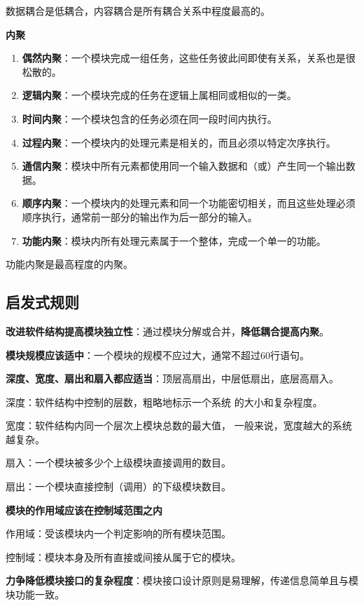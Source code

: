 \documentclass[cn, blue, normal, 12pt]{elegantnote}
\begin{document}
数据耦合是低耦合，内容耦合是所有耦合关系中程度最高的。

\textbf{内聚}

\begin{enumerate}
    \item \textbf{偶然内聚}：一个模块完成一组任务，这些任务彼此间即使有关系，关系也是很松散的。
    \item \textbf{逻辑内聚}：一个模块完成的任务在逻辑上属相同或相似的一类。
    \item \textbf{时间内聚}：一个模块包含的任务必须在同一段时间内执行。
    \item \textbf{过程内聚}：一个模块内的处理元素是相关的，而且必须以特定次序执行。
    \item \textbf{通信内聚}：模块中所有元素都使用同一个输入数据和（或）产生同一个输出数据。
    \item \textbf{顺序内聚}：一个模块内的处理元素和同一个功能密切相关，而且这些处理必须顺序执行，通常前一部分的输出作为后一部分的输入。
    \item \textbf{功能内聚}：模块内所有处理元素属于一个整体，完成一个单一的功能。
\end{enumerate}

功能内聚是最高程度的内聚。

\subsection{启发式规则}

\textbf{改进软件结构提高模块独立性}：通过模块分解或合并，\textbf{降低耦合提高内聚}。

\textbf{模块规模应该适中}：一个模块的规模不应过大，通常不超过60行语句。

\textbf{深度、宽度、扇出和扇入都应适当}：顶层高扇出，中层低扇出，底层高扇入。

深度：软件结构中控制的层数，粗略地标示一个系统
的大小和复杂程度。

宽度：软件结构内同一个层次上模块总数的最大值，
一般来说，宽度越大的系统越复杂。

扇入：一个模块被多少个上级模块直接调用的数目。

扇出：一个模块直接控制（调用）的下级模块数目。

\textbf{模块的作用域应该在控制域范围之内}

作用域：受该模块内一个判定影响的所有模块范围。

控制域：模块本身及所有直接或间接从属于它的模块。

\textbf{力争降低模块接口的复杂程度}：模块接口设计原则是易理解，传递信息简单且与模块功能一致。
\end{document}
